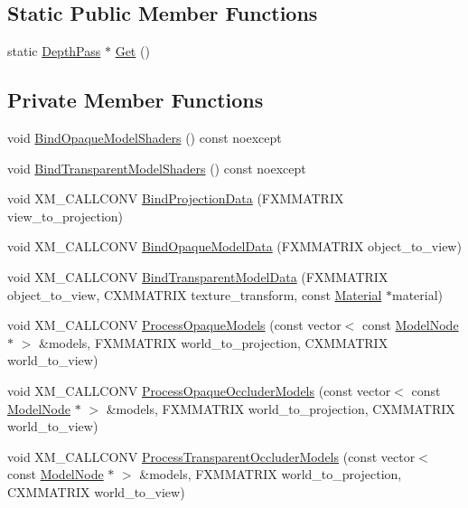 \subsection*{Static Public Member Functions}
\begin{DoxyCompactItemize}
\item 
static \hyperlink{classmage_1_1_depth_pass}{Depth\+Pass} $\ast$ \hyperlink{classmage_1_1_depth_pass_a62a4f1dd404fdb43517d372537ea0e7f}{Get} ()
\end{DoxyCompactItemize}
\subsection*{Private Member Functions}
\begin{DoxyCompactItemize}
\item 
void \hyperlink{classmage_1_1_depth_pass_a6e10b136e64265fa36b9152353946bdc}{Bind\+Opaque\+Model\+Shaders} () const noexcept
\item 
void \hyperlink{classmage_1_1_depth_pass_af7765d2e9d94627671341d5d782b16d2}{Bind\+Transparent\+Model\+Shaders} () const noexcept
\item 
void X\+M\+\_\+\+C\+A\+L\+L\+C\+O\+NV \hyperlink{classmage_1_1_depth_pass_a9fa93bf5d67b9396d358e595be55a075}{Bind\+Projection\+Data} (F\+X\+M\+M\+A\+T\+R\+IX view\+\_\+to\+\_\+projection)
\item 
void X\+M\+\_\+\+C\+A\+L\+L\+C\+O\+NV \hyperlink{classmage_1_1_depth_pass_a674fc5fe2e8cae4c704a554dc8bc1fdd}{Bind\+Opaque\+Model\+Data} (F\+X\+M\+M\+A\+T\+R\+IX object\+\_\+to\+\_\+view)
\item 
void X\+M\+\_\+\+C\+A\+L\+L\+C\+O\+NV \hyperlink{classmage_1_1_depth_pass_a37236eb83793b4f11f1f4f2ed86f60e2}{Bind\+Transparent\+Model\+Data} (F\+X\+M\+M\+A\+T\+R\+IX object\+\_\+to\+\_\+view, C\+X\+M\+M\+A\+T\+R\+IX texture\+\_\+transform, const \hyperlink{structmage_1_1_material}{Material} $\ast$material)
\item 
void X\+M\+\_\+\+C\+A\+L\+L\+C\+O\+NV \hyperlink{classmage_1_1_depth_pass_a2aabb8bd4676a8ce633e5cb91e6b13d9}{Process\+Opaque\+Models} (const vector$<$ const \hyperlink{classmage_1_1_model_node}{Model\+Node} $\ast$ $>$ \&models, F\+X\+M\+M\+A\+T\+R\+IX world\+\_\+to\+\_\+projection, C\+X\+M\+M\+A\+T\+R\+IX world\+\_\+to\+\_\+view)
\item 
void X\+M\+\_\+\+C\+A\+L\+L\+C\+O\+NV \hyperlink{classmage_1_1_depth_pass_acfbb86af8b6a106fe202a6999df9d744}{Process\+Opaque\+Occluder\+Models} (const vector$<$ const \hyperlink{classmage_1_1_model_node}{Model\+Node} $\ast$ $>$ \&models, F\+X\+M\+M\+A\+T\+R\+IX world\+\_\+to\+\_\+projection, C\+X\+M\+M\+A\+T\+R\+IX world\+\_\+to\+\_\+view)
\item 
void X\+M\+\_\+\+C\+A\+L\+L\+C\+O\+NV \hyperlink{classmage_1_1_depth_pass_a885b8d686f5f2e50ea8020073d551e82}{Process\+Transparent\+Occluder\+Models} (const vector$<$ const \hyperlink{classmage_1_1_model_node}{Model\+Node} $\ast$ $>$ \&models, F\+X\+M\+M\+A\+T\+R\+IX world\+\_\+to\+\_\+projection, C\+X\+M\+M\+A\+T\+R\+IX world\+\_\+to\+\_\+view)
\end{DoxyCompactItemize}
